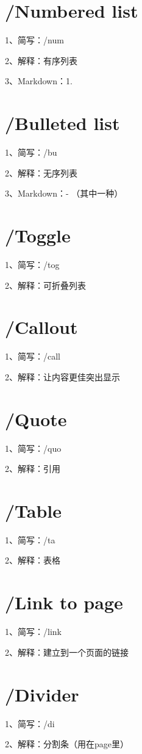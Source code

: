 \section{/Numbered list}

1、简写：/num

2、解释：有序列表

3、Markdown：1. 

\section{/Bulleted list}

1、简写：/bu

2、解释：无序列表

3、Markdown：- （其中一种）

\section{/Toggle}

1、简写：/tog

2、解释：可折叠列表

\section{/Callout}

1、简写：/call

2、解释：让内容更佳突出显示

\section{/Quote}

1、简写：/quo

2、解释：引用

\section{/Table}

1、简写：/ta

2、解释：表格

\section{/Link to page}

1、简写：/link

2、解释：建立到一个页面的链接

\section{/Divider}

1、简写：/di

2、解释：分割条（用在page里）

